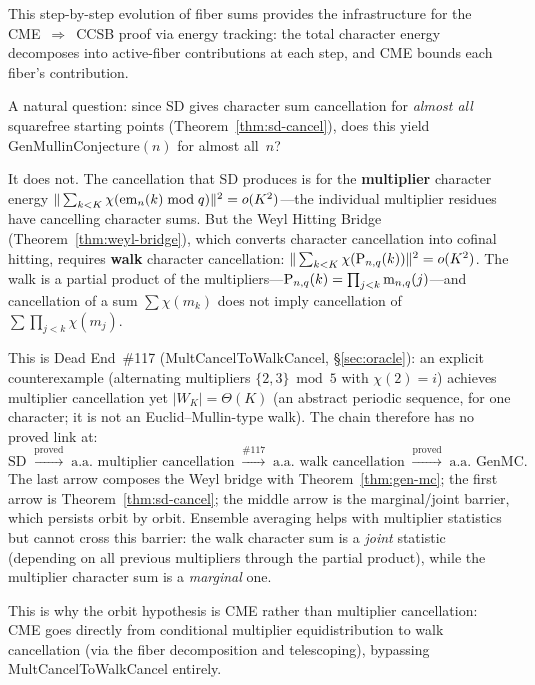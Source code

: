 \noindent This step-by-step evolution of fiber sums provides the
infrastructure for the CME~$\Rightarrow$~CCSB proof via energy
tracking: the total character energy decomposes into active-fiber
contributions at each step, and CME bounds each fiber's contribution.

\begin{remark}
\label{rem:almost-all-mc}
A natural question: since SD gives character sum cancellation for
\emph{almost all} squarefree starting points
(Theorem~\ref{thm:sd-cancel}), does this yield
$\mathrm{GenMullinConjecture}(n)$ for almost all~$n$?

It does not.  The cancellation that SD produces is for the
\textbf{multiplier} character energy
$\|\sum_{k<K} \chi(\mathrm{em}_{n}(k) \bmod q)\|^2 = o(K^2)$---the
individual multiplier residues have cancelling character sums.  But
the Weyl Hitting Bridge (Theorem~\ref{thm:weyl-bridge}), which
converts character cancellation into cofinal hitting, requires
\textbf{walk} character cancellation:
$\|\sum_{k<K} \chi(\mathrm{P}_{n,q}(k))\|^2 = o(K^2)$.  The walk is a
partial product of the multipliers---$\mathrm{P}_{n,q}(k) = \prod_{j<k}
\mathrm{m}_{n,q}(j)$---and cancellation of a sum $\sum \chi(m_k)$ does not
imply cancellation of $\sum \prod_{j<k} \chi(m_j)$.

This is Dead End~\#117 (MultCancelToWalkCancel, \S\ref{sec:oracle}):
an explicit counterexample (alternating multipliers $\{2,3\} \bmod 5$
with $\chi(2) = i$) achieves multiplier cancellation yet
$|W_K| = \Theta(K)$ (an abstract periodic sequence, for one
character; it is not an Euclid--Mullin-type walk).  The chain therefore
has no proved link at:
\[
  \mathrm{SD}
  \;\xrightarrow{\text{proved}}\;
  \text{a.a.\ multiplier cancellation}
  \;\xrightarrow{\text{\#117}}\;
  \text{a.a.\ walk cancellation}
  \;\xrightarrow{\text{proved}}\;
  \text{a.a.\ GenMC}.
\]
The last arrow composes the Weyl bridge with
Theorem~\ref{thm:gen-mc}; the first arrow is
Theorem~\ref{thm:sd-cancel}; the middle arrow is the
marginal/joint barrier, which persists orbit by orbit.
Ensemble averaging helps with multiplier statistics but cannot cross
this barrier: the walk character sum is a \emph{joint} statistic
(depending on all previous multipliers through the partial product),
while the multiplier character sum is a \emph{marginal} one.

This is why the orbit hypothesis is CME rather than multiplier cancellation:
CME goes directly from conditional multiplier equidistribution to
walk cancellation (via the fiber decomposition and telescoping),
bypassing MultCancelToWalkCancel entirely.


\end{remark}
